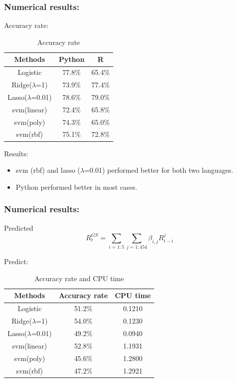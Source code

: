 \documentclass{beamer}
\begin{document}
\begin{frame}
\frametitle{Numerical results:}

\begin{block}{Accuracy rate:}
\begin{table}[h!]\large
  \caption{Accuracy rate}
\begin{center}
    \begin{tabular}{| c | c| c | }
    \hline
    Methods& Python &  R\\
    \hline
Logistic  &77.8\%&	65.4\%\\
Ridge($\lambda$=1)&73.9\%	&77.4\%\\
Lasso($\lambda$=0.01)&78.6\%&	79.0\%\\
svm(linear)&72.4\%	&65.8\%\\
svm(poly)&74.3\%&	65.0\%\\
svm(rbf)&75.1\%	&72.8\%\\
\hline
\end{tabular}
\end{center}
\end{table}
\end{block}

\begin{block}{Results:}
\begin{itemize}
        \item  svm (rbf) and lasso ($\lambda$=0.01) performed better for both two languages.
        \item  Python performed better in most cases.
    \end{itemize}


\end{block}
\end{frame}


\begin{frame}
\frametitle{Numerical results:}
\begin{block}{Predicted}
\begin{equation}
R_t^{GS} = \sum_{i=1:5}{\sum_{j=1:454}\beta_{i,j}R_{t-i}^j}
\end{equation}
\end{block}

\begin{block}{Predict:}
\begin{table}[h!]\large
  \caption{Accuracy rate and CPU time}
\begin{center}
    \begin{tabular}{| c | c|c|}
    \hline
    Methods& Accuracy rate& CPU time \\
    \hline
Logistic  &51.2\%&0.1210\\
Ridge($\lambda$=1)&54.0\%&0.1230\\
Lasso($\lambda$=0.01)&49.2\%&0.0940\\
svm(linear)&52.8\%&1.1931\\
svm(poly)&45.6\%&1.2800	\\
svm(rbf)&47.2\%&1.2921\\
\hline
\end{tabular}
\end{center}
\end{table}

\end{block}

\end{frame}
%
%
\end{document}
